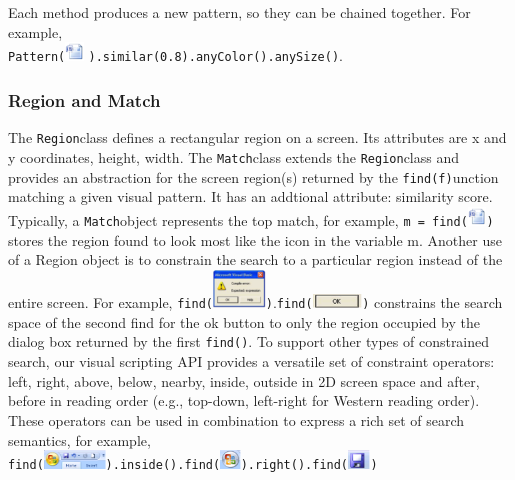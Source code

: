 \documentclass{chi2009}
\newcommand{\find}[1]{{\tt find({#1})}}
\newcommand{\Region}[0]{{\tt Region}}
\newcommand{\Match}[0]{{\tt Match}}
\begin{document}
Each method produces a new pattern, so they can be chained together.  
For example, \\
{\small
\verb|Pattern(|\includegraphics[height=0.2in]{figures/word.png}
\verb|).similar(0.8).anyColor().anySize()|}.

\subsubsection{Region and Match}
The \Region class defines a rectangular region on a screen.
Its attributes are x and y coordinates, height, width.
The \Match class extends the \Region class and
provides an abstraction for the screen region(s)
returned by the \find function matching a given visual pattern. 
It has an addtional attribute: similarity score.
Typically, a \Match object represents the top match, for example, 
{\tt m = }\find{\includegraphics[height=0.2in]{figures/word.png}}
stores the region found to look most like the icon in the variable m. 
Another use of a Region object is to
constrain the search to a particular region instead of the entire screen. For
example, 
\find{\includegraphics[height=0.4in]{figures/dialog.png}}.\find{\includegraphics[height=0.15in]{figures/ok.png}}
 constrains the search space of the second find for the
ok button to only the region occupied by the dialog box returned by the first
\find{}. 
To support other types of constrained search, our visual scripting API
provides a versatile set of constraint operators: left, right, above, below,
nearby, inside, outside in 2D screen space and after, before in reading order
(e.g., top-down, left-right for Western reading order). These operators can be
used in combination to express a rich set of search semantics, for example,\\
{\small
\find{\includegraphics[height=0.2in]{figures/toolbar.png}}{\tt.inside().}\find{\includegraphics[height=0.2in]{figures/btn1.png}}{\tt.right().}\find{\includegraphics[height=0.2in]{figures/btn2.png}}
}
\end{document}
